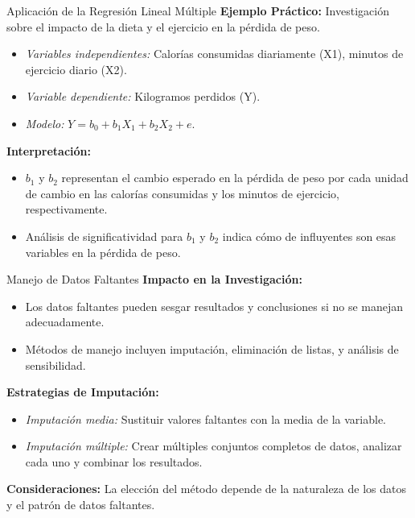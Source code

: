 ﻿\documentclass{beamer}
\begin{document}
\begin{frame}{Aplicación de la Regresión Lineal Múltiple}
\textbf{Ejemplo Práctico:} Investigación sobre el impacto de la dieta y el ejercicio en la pérdida de peso.
\begin{itemize}
    \item \textit{Variables independientes:} Calorías consumidas diariamente (X1), minutos de ejercicio diario (X2).
    \item \textit{Variable dependiente:} Kilogramos perdidos (Y).
    \item \textit{Modelo:} $Y = b_0 + b_1X_1 + b_2X_2 + e$.
\end{itemize}
\textbf{Interpretación:}
\begin{itemize}
    \item $b_1$ y $b_2$ representan el cambio esperado en la pérdida de peso por cada unidad de cambio en las calorías consumidas y los minutos de ejercicio, respectivamente.
    \item Análisis de significatividad para $b_1$ y $b_2$ indica cómo de influyentes son esas variables en la pérdida de peso.
\end{itemize}
\end{frame}

\begin{frame}{Manejo de Datos Faltantes}
\textbf{Impacto en la Investigación:}
\begin{itemize}
    \item Los datos faltantes pueden sesgar resultados y conclusiones si no se manejan adecuadamente.
    \item Métodos de manejo incluyen imputación, eliminación de listas, y análisis de sensibilidad.
\end{itemize}
\textbf{Estrategias de Imputación:}
\begin{itemize}
    \item \textit{Imputación media:} Sustituir valores faltantes con la media de la variable.
    \item \textit{Imputación múltiple:} Crear múltiples conjuntos completos de datos, analizar cada uno y combinar los resultados.
\end{itemize}
\textbf{Consideraciones:} La elección del método depende de la naturaleza de los datos y el patrón de datos faltantes.
\end{frame}
\end{document}
